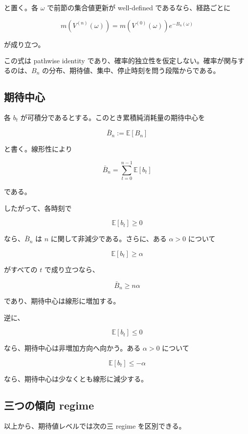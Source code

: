 \documentclass[12pt,a4paper]{article}
\begin{document}
と置く。各 \(\omega\) で前節の集合値更新が well-defined であるなら、経路ごとに

\[
m(V^{(n)}(\omega)) = m(V^{(0)}(\omega)) e^{-B_{n}(\omega)}
\]

が成り立つ。

この式は pathwise identity であり、確率的独立性を仮定しない。確率が関与するのは、\(B_{n}\) の分布、期待値、集中、停止時刻を問う段階からである。

\subsection{期待中心}\label{ux671fux5f85ux4e2dux5fc3}

各 \(b_{t}\) が可積分であるとする。このとき累積純消耗量の期待中心を

\[
\bar B_{n} := \mathbb E[B_{n}]
\]

と書く。線形性により

\[
\bar B_{n} = \sum_{t=0}^{n-1} \mathbb E[b_{t}]
\]

である。

したがって、各時刻で

\[
\mathbb E[b_{t}] \ge 0
\]

なら、\(\bar B_{n}\) は \(n\) に関して非減少である。さらに、ある \(\alpha>0\) について

\[
\mathbb E[b_{t}] \ge \alpha
\]

がすべての \(t\) で成り立つなら、

\[
\bar B_{n} \ge n\alpha
\]

であり、期待中心は線形に増加する。

逆に、

\[
\mathbb E[b_{t}] \le 0
\]

なら、期待中心は非増加方向へ向かう。ある \(\alpha>0\) について

\[
\mathbb E[b_{t}] \le -\alpha
\]

なら、期待中心は少なくとも線形に減少する。

\subsection{三つの傾向 regime}\label{ux4e09ux3064ux306eux50beux5411-regime}

以上から、期待値レベルでは次の三 regime を区別できる。
\end{document}
